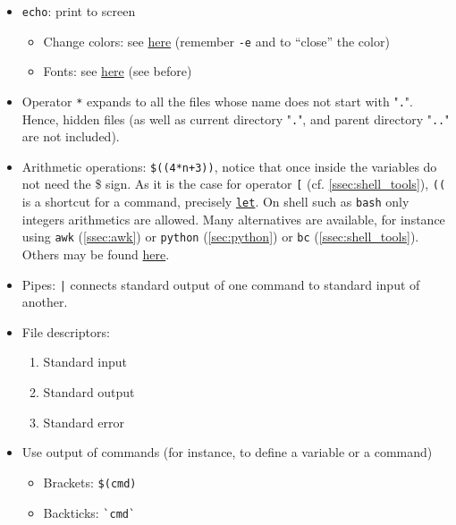 \documentclass[a4paper,12pt,%
              final%
              ]{article}
\begin{document}
\begin{itemize}
\begin{itemize}
    \end{itemize}
  \item \texttt{echo}: print to screen
    \begin{itemize}
      \item Change colors: see \href{https://stackoverflow.com/questions/5947742/how-to-change-the-output-color-of-echo-in-linux}{here} (remember \verb|-e| and to ``close'' the color)
      \item Fonts: see \href{https://askubuntu.com/questions/528928/how-to-do-underline-bold-italic-strikethrough-color-background-and-size-i}{here} (see before)
    \end{itemize}
  \item Operator \texttt{*} expands to all the files whose name does not start with "\texttt{.}". Hence, hidden files (as well as current directory "\texttt{.}", and parent directory "\texttt{..}" are not included).
  \item Arithmetic operations: \verb|$((4*n+3))|, notice that once inside the variables do not need the \$ sign. As it is the case for operator \verb|[| (cf. \autoref{ssec:shell_tools}), \verb|((| is a shortcut for a command, precisely \href{https://www.computerhope.com/unix/bash/let.htm}{\texttt{let}}. On shell such as \texttt{bash} only integers arithmetics are allowed. Many alternatives are available, for instance using \texttt{awk} (\autoref{ssec:awk}) or \texttt{python} (\autoref{sec:python}) or \texttt{bc} (\autoref{ssec:shell_tools}). Others may be found \href{https://unix.stackexchange.com/questions/40786/how-to-do-integer-float-calculations-in-bash-or-other-languages-frameworks}{here}.
  \item Pipes: \verb!|! connects standard output of one command to standard input of another.
  \item File descriptors:
    \begin{enumerate}[start=0,label={\texttt{\arabic*} :}]
      \item Standard input
      \item Standard output
      \item Standard error
    \end{enumerate}
  \item Use output of commands (for instance, to define a variable or a command)
    \begin{itemize}
      \item Brackets: \verb|$(cmd)|
      \item Backticks: \verb|`cmd`|
    \end{itemize}

\end{itemize}
\end{document}
